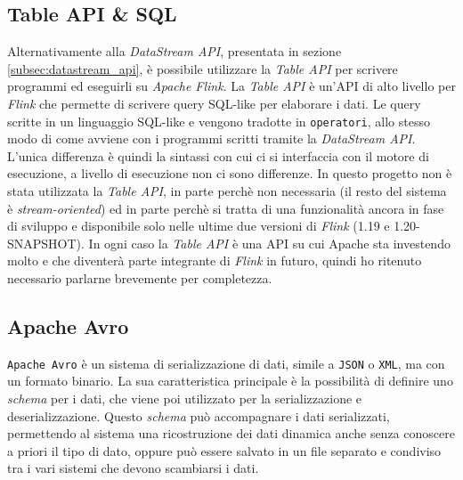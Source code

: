 \subsection{Table API \& SQL}
\label{subsec:flink_table_api}
Alternativamente alla \textit{DataStream API}, presentata in sezione \ref{subsec:datastream_api}, è possibile utilizzare la \textit{Table API}
 per scrivere programmi ed eseguirli su \textit{Apache Flink}.
La \textit{Table API} è un'API di alto livello per \textit{Flink} che permette di scrivere query SQL-like per elaborare i dati.
Le query scritte in un linguaggio SQL-like e vengono tradotte in \texttt{operatori}, 
allo stesso modo di come avviene con i programmi scritti tramite la \textit{DataStream API}.
L'unica differenza è quindi la sintassi con cui ci si interfaccia con il motore di esecuzione, a livello di esecuzione non ci sono differenze.
In questo progetto non è stata utilizzata la \textit{Table API}, in parte perchè non necessaria (il resto del sistema è \textit{stream-oriented}) ed in parte
perchè si tratta di una funzionalità ancora in fase di sviluppo e disponibile solo nelle ultime due versioni di \textit{Flink} (1.19 e 1.20-SNAPSHOT).
In ogni caso la \textit{Table API} è una API su cui Apache sta investendo molto e che diventerà parte integrante di \textit{Flink} in futuro, quindi 
ho ritenuto necessario parlarne brevemente per completezza.

\subsection{Apache Avro}
\label{subsec:avro_overview}
\texttt{Apache Avro} è un sistema di serializzazione di dati, simile a \texttt{JSON} o \texttt{XML}, ma con un formato binario.
La sua caratteristica principale è la possibilità di definire uno \textit{schema} per i dati, che viene poi utilizzato per la serializzazione e deserializzazione.
Questo \textit{schema} può accompagnare i dati serializzati, permettendo al sistema una ricostruzione dei dati dinamica anche senza conoscere a priori il tipo di dato,
oppure può essere salvato in un file separato e condiviso tra i vari sistemi che devono scambiarsi i dati.\\\\

